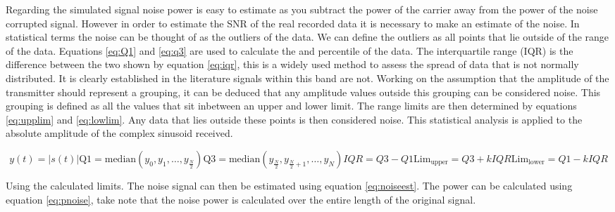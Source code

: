 Regarding the simulated signal noise power is easy to estimate as you subtract the power of the carrier away from the power of the noise corrupted signal. However in order to estimate the SNR of the real recorded data it is necessary to make an estimate of the noise. In statistical terms the noise can be thought of as the outliers of the data. We can define the outliers as all points that lie outside of the range of the data. Equations \ref{eq:Q1} and \ref{eq:q3} are used to calculate the  and  percentile of the data. The interquartile range (IQR) is the difference between the two shown by equation \ref{eq:iqr}, this is a widely used method to assess the spread of data that is not normally distributed. It is clearly established in the literature signals within this band are not. Working on the assumption that the amplitude of the transmitter should represent a grouping, it can be deduced that any amplitude values outside this grouping can be considered noise. This grouping is defined as all the values that sit inbetween an upper and lower limit.
The range limits are then determined by equations \ref{eq:upplim} and \ref{eq:lowlim}. Any data that lies outside these points is then considered noise. This statistical analysis is applied to the absolute amplitude of the complex sinusoid received.

\begin{multicols}{2}

\begin{subequations}
    \begin{equation}
        y(t) = |s(t)|
    \end{equation}
    \begin{equation}
        \text{Q1} = \text{median}\left(y_{0},y_{1},\dots,y_{\frac{N}{2}}\right)
        \label{eq:Q1}
    \end{equation}
    \begin{equation}
        \text{Q3} = \text{median}\left(y_{\frac{N}{2}},y_{\frac{N}{2}+1},\dots,y_{N}\right)
        \label{eq:q3}
    \end{equation}
    \begin{equation}
        IQR = Q3 - Q1
        \label{eq:iqr}
    \end{equation}
    \begin{equation}
        \text{Lim}_{\text{upper}} = Q3 + k IQR
        \label{eq:upplim}
    \end{equation}
    \begin{equation}
        \text{Lim}_{\text{lower}} = Q1 - k IQR
        \label{eq:lowlim}
    \end{equation}
\end{subequations}
\end{multicols}
Using the calculated limits. The noise signal can then be estimated using equation \ref{eq:noiseest}. The power can be calculated using equation \ref{eq:pnoise}, take note that the noise power is calculated over the entire length of the original signal. 

